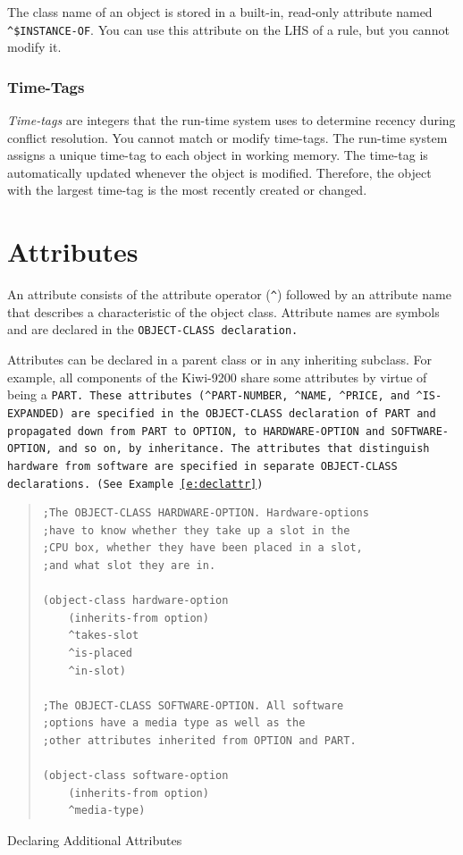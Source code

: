 The class name of an object is stored in a built-in,
read-only attribute named \verb|^$INSTANCE-OF|. You can use this
attribute on the LHS of a rule, but you cannot modify it.

\subsubsection*{Time-Tags}

\emph{Time-tags} are integers that the run-time system uses to
determine recency during conflict resolution. You cannot match or
modify time-tags. The run-time system assigns a unique time-tag to
each object in working memory. The time-tag is automatically updated
whenever the object is modified. Therefore, the object with the
largest time-tag is the most recently created or changed.

\section{Attributes}

An attribute consists of the attribute operator (\verb|^|) followed
by an attribute name that describes a characteristic of the
object class. Attribute names are symbols and are declared in
the \tt{OBJECT-CLASS} declaration.

Attributes can be declared in a parent class or in any
inheriting subclass. For example, all components of the
Kiwi-9200 share some attributes by virtue of being a \tt{PART}.
These attributes (\verb|^PART-NUMBER|, \verb|^NAME|, \verb|^PRICE|, and
\verb|^IS-EXPANDED|) are specified in the \tt{OBJECT-CLASS} declaration
of \tt{PART} and propagated down from \tt{PART} to \tt{OPTION}, to
\tt{HARDWARE-OPTION} and \tt{SOFTWARE-OPTION}, and so on, by
inheritance. The attributes that distinguish hardware from
software are specified in separate \tt{OBJECT-CLASS} declarations.
(See Example~\ref{e:declattr})

\begin{example}[h]
\begin{quote}
\begin{verbatim}
;The OBJECT-CLASS HARDWARE-OPTION. Hardware-options
;have to know whether they take up a slot in the
;CPU box, whether they have been placed in a slot,
;and what slot they are in.

(object-class hardware-option
    (inherits-from option)
    ^takes-slot
    ^is-placed
    ^in-slot)

;The OBJECT-CLASS SOFTWARE-OPTION. All software
;options have a media type as well as the
;other attributes inherited from OPTION and PART.

(object-class software-option
    (inherits-from option)
    ^media-type)
\end{verbatim}
\end{quote}
\caption{Declaring Additional Attributes}
\label{e:declattr}
\end{example}


